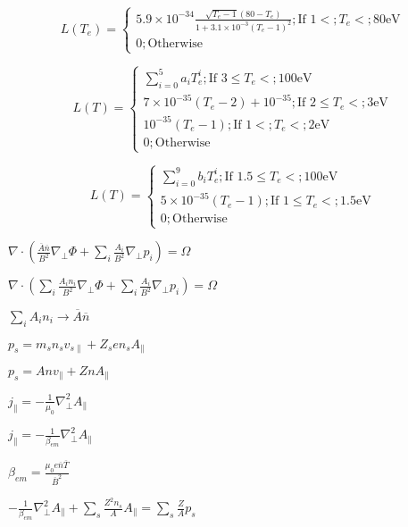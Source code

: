 \begin{equation}
L\left(T_e\right) = \left\{\begin{array}{cl} 5.9\times 10^{-34}\frac{\sqrt{T_e 
- 1}\left(80 - T_e\right)}{1 + 3.1\times 10^{-3}\left(T_e - 1\right)^2} ; 
\textrm{If $1 <; T_e <; 80$eV} \\ 0 ; 
\textrm{Otherwise}\end{array}\right.\end{equation}


\begin{equation}
L\left(T\right) = \left\{\begin{array}{cl} \sum_{i=0}^5 a_i T_e^i ; \textrm{If 
$3 \le T_e <; 100$eV} \\ 7\times 10^{-35} \left(T_e - 2\right) + 10^{-35} ; 
\textrm{If $2 \le T_e <; 3$eV} \\ 10^{-35}\left(T_e - 1\right) ; \textrm{If $1 
<; T_e <; 2$eV} \\ 0 ; \textrm{Otherwise}\end{array}\right.\end{equation}


\begin{equation}
L\left(T\right) = \left\{\begin{array}{cl} \sum_{i=0}^9 b_i T_e^i ; \textrm{If 
$1.5 \le T_e <; 100$eV} \\ 5\times 10^{-35} \left(T_e - 1\right) ; \textrm{If 
$1 \le T_e <; 1.5$eV} \\ 0 ; \textrm{Otherwise}\end{array}\right.\end{equation}


$\nabla\cdot\left(\frac{\overline{A}\overline{n}}{B^2}\nabla_\perp \Phi + 
\sum_i\frac{A_i}{B^2}\nabla_\perp p_i\right) = \Omega$

$\nabla\cdot\left(\sum_i \frac{A_i n_i}{B^2}\nabla_\perp \Phi + \sum_i 
\frac{A_i}{B^2}\nabla_\perp p_i\right) = \Omega$

$\sum_i A_i n_i \rightarrow \overline{A}\overline{n}$

$p_s = m_s n_s v_{s\|} + Z_s e n_s A_{\|}$

$p_s = A n v_{\|} + Z n A_{\|}$

$j_{\|} = -\frac{1}{\mu_0}\nabla_\perp^2 A_{\|}$

$j_{\|} = - \frac{1}{\beta_{em}}\nabla_\perp^2 A_{\|}$

$\beta_{em} = \frac{\mu_0 e \overline{n} \overline{T}}{\overline{B}^2}$

$- \frac{1}{\beta_{em}} \nabla_\perp^2 A_{\|} + \sum_s \frac{Z^2 n_s}{A}A_{\|} 
= \sum_s \frac{Z}{A} p_s$

